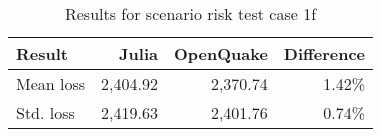 \begin{table}[htbp]

\centering
\begin{tabular}{ l r r r }

\hline
\rowcolor{anti-flashwhite}
\bf{Result} & \bf{Julia} & \bf{OpenQuake} & \bf{Difference}\\
\hline
Mean loss & 2,404.92 & 2,370.74 & 1.42\% \\
Std. loss & 2,419.63 & 2,401.76 & 0.74\% \\
\hline
\end{tabular}

\caption{Results for scenario risk test case 1f}
\label{tab:result-sr-1f}
\end{table}
